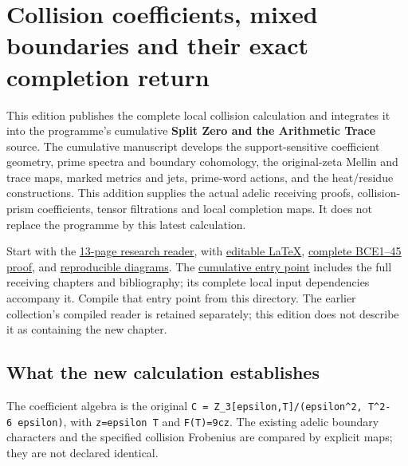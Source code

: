\documentclass[
]{article}
\author{}
\date{}
\begin{document}
\section{Collision coefficients, mixed boundaries and their exact
completion
return}\label{collision-coefficients-mixed-boundaries-and-their-exact-completion-return}

This edition publishes the complete local collision calculation and
integrates it into the programme's cumulative \textbf{Split Zero and the
Arithmetic Trace} source. The cumulative manuscript develops the
support-sensitive coefficient geometry, prime spectra and boundary
cohomology, the original-zeta Mellin and trace maps, marked metrics and
jets, prime-word actions, and the heat/residue constructions. This
addition supplies the actual adelic receiving proofs, collision-prism
coefficients, tensor filtrations and local completion maps. It does not
replace the programme by this latest calculation.

Start with the \href{MIXED_BOUNDARY_COLLISION_READER.pdf}{13-page
research reader}, with
\href{MIXED_BOUNDARY_COLLISION_READER.tex}{editable LaTeX},
\href{MIXED_BOUNDARY_COLLISION_EXTENSION.tex}{complete BCE1--45 proof},
and \href{MIXED_BOUNDARY_COLLISION_FIGURE.tex}{reproducible diagrams}.
The \href{MAIN.tex}{cumulative entry point} includes the full receiving
chapters and bibliography; its complete local input dependencies
accompany it. Compile that entry point from this directory. The earlier
collection's compiled reader is retained separately; this edition does
not describe it as containing the new chapter.

\subsection{What the new calculation
establishes}\label{what-the-new-calculation-establishes}

The coefficient algebra is the original
\texttt{C\ =\ Z\_3{[}epsilon,T{]}/(epsilon\^{}2,\ T\^{}2-6\ epsilon)},
with \texttt{z=epsilon\ T} and \texttt{F(T)=9cz}. The existing adelic
boundary characters and the specified collision Frobenius are compared
by explicit maps; they are not declared identical.
\end{document}
